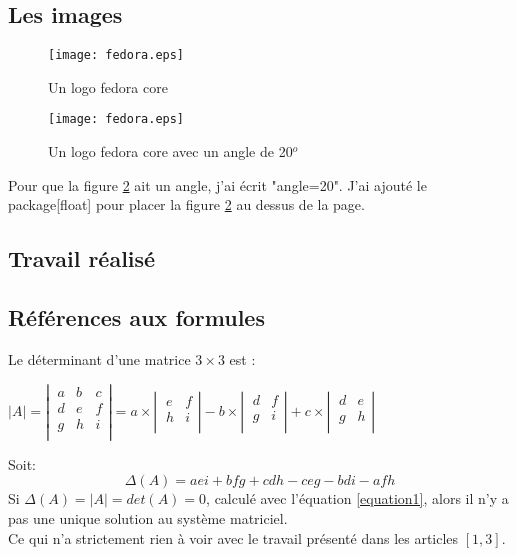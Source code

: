 \documentclass[a4paper,french,10pt]{report}
\begin{document}
	\section{Les images}
	\label{section2}
	\begin{figure}[h]
		\centering
		\texttt{[image: fedora.eps]}
		\caption{Un logo fedora core}
		\label{figure1}
	\end{figure}	
	
	\begin{figure}[H]
		\begin{center}
		\texttt{[image: fedora.eps]}
		\caption{Un logo fedora core avec un angle de 20$^o$}
		\label{figure2}
		\end{center}
	\end{figure}
	Pour que la figure \ref{figure2}  ait un angle, j'ai écrit "angle=20". J'ai ajouté le package[float] pour placer la figure \ref{figure2} au dessus de la page.

	\begin{center}
			\chapter{Travail réalisé}
			\label{chapitre2}
	\end{center}
	\section{Références aux formules}
	\label{section3}
	Le déterminant d'une matrice $3 \times 3$ est : 
	\begin{center}
		$|A|=\left|
		\begin{array}{lrc}
		\ a & b & c \\
		\ d & e & f \\
		\ g & h & i \\
		\end{array}
		\right|
		=a \times \left|
		\begin{array}{cc}
		\ e & f \\
		\ h & i \\
		\end{array} \right|
		-b \times \left|
		\begin{array}{cc}
		\ d & f \\
		\ g & i \\
		\end{array} \right|
		+c \times \left|
		\begin{array}{cc}
		\ d & e \\
		\ g & h \\
		\end{array} \right|$
	\end{center} \par
	Soit: 
	\begin{equation}
		\label{equation1}
	    \Delta (A) = aei+bfg+cdh-ceg-bdi-afh
	\end{equation}
Si $\Delta(A) = |A| = det(A) = 0$, calculé avec l'équation \ref{equation1}, alors il n'y a pas une unique solution au système matriciel. \\
Ce qui n'a strictement rien à voir avec le travail présenté dans les articles $[1, 3]$.\\
\cite{burke1997automated}
\end{document}

